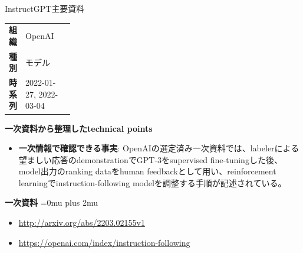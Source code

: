\begin{technicalnote}{InstructGPT}{主要資料}
\begingroup
\begin{tabularx}{\linewidth}{@{}>{\bfseries}p{0.22\linewidth}X@{}}
組織 & OpenAI \\
種別 & モデル \\
時系列 & 2022-01-27, 2022-03-04 \\
\end{tabularx}
\smallskip
{\bfseries 一次資料から整理したtechnical points}
\begin{itemize}[leftmargin=1.5em,itemsep=0.35em]
\item \textbf{一次情報で確認できる事実}: OpenAIの選定済み一次資料では、labelerによる望ましい応答のdemonstrationでGPT-3をsupervised fine-tuningした後、model出力のranking dataをhuman feedbackとして用い、reinforcement learningでinstruction-following modelを調整する手順が記述されている。
\end{itemize}
\begin{minipage}{\linewidth}
\begin{samepage}
{\bfseries 一次資料}
\begingroup\sloppy
\Urlmuskip=0mu plus 2mu\relax
\begin{itemize}[leftmargin=1.5em,itemsep=0.25em]
\item {\scriptsize\url{http://arxiv.org/abs/2203.02155v1}}
\item {\scriptsize\url{https://openai.com/index/instruction-following}}
\end{itemize}
\endgroup
\end{samepage}
\end{minipage}
\endgroup
\end{technicalnote}
\medskip


